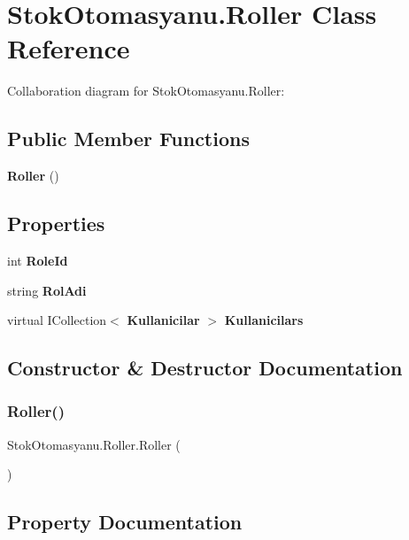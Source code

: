 \section{Stok\+Otomasyanu.\+Roller Class Reference}
\label{class_stok_otomasyanu_1_1_roller}


Collaboration diagram for Stok\+Otomasyanu.\+Roller\+:
\subsection*{Public Member Functions}
\begin{DoxyCompactItemize}
\item 
\textbf{ Roller} ()
\end{DoxyCompactItemize}
\subsection*{Properties}
\begin{DoxyCompactItemize}
\item 
int \textbf{ Role\+Id}\hspace{0.3cm}{\ttfamily  [get, set]}
\item 
string \textbf{ Rol\+Adi}\hspace{0.3cm}{\ttfamily  [get, set]}
\item 
virtual I\+Collection$<$ \textbf{ Kullanicilar} $>$ \textbf{ Kullanicilars}\hspace{0.3cm}{\ttfamily  [get, set]}
\end{DoxyCompactItemize}


\subsection{Constructor \& Destructor Documentation}
\mbox{\label{class_stok_otomasyanu_1_1_roller_abf8997159ef599cdd03739055d7affaa}} 
\subsubsection{Roller()}
{\footnotesize\ttfamily Stok\+Otomasyanu.\+Roller.\+Roller (\begin{DoxyParamCaption}{ }\end{DoxyParamCaption})}



\subsection{Property Documentation}
\mbox{\label{class_stok_otomasyanu_1_1_roller_a8edb7ad3e4c37509b17c8f482a211521}} 
